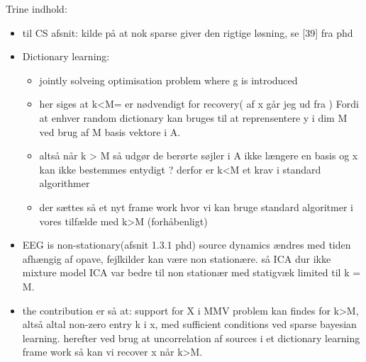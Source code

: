 Trine indhold:
\begin{itemize}
\item til CS afsnit: kilde på at nok sparse giver den rigtige løsning, se [39] fra phd
\item Dictionary learning:
\begin{itemize}
\item jointly solveing optimisation problem where g is introduced
\item her siges at k<M= er nødvendigt for recovery( af x går jeg ud fra ) Fordi at enhver random dictionary kan bruges til at reprensentere y i dim M ved brug af M basis vektore i A.
\item altså når k > M så udgør de berørte søjler i A ikke længere en basis og x kan ikke bestemmes entydigt ? derfor er k<M et krav i standard algorithmer
\item der sættes så et nyt frame work hvor vi kan bruge standard algoritmer i vores tilfælde med k>M (forhåbenligt) 
\end{itemize}
\item EEG is non-stationary(afsnit 1.3.1 phd) source dynamics ændres med tiden afhængig af opave, fejlkilder kan være non stationære. så ICA dur ikke mixture model ICA var bedre til non stationær med statigvæk limited til k = M. 
\item the contribution er så at: support for X i MMV problem kan findes for k>M, altså altal non-zero entry k i x, med sufficient conditions ved sparse bayesian learning. herefter ved brug at uncorrelation af sources i et dictionary learning frame work så kan vi recover x når k>M. 
\end{itemize}  
  















